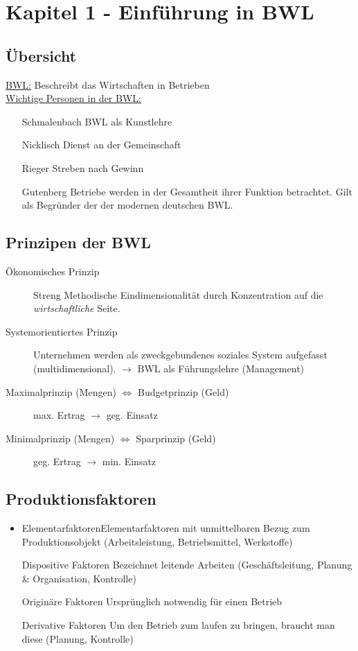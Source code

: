 \section{Kapitel 1 - Einführung in BWL}
\subsection{Übersicht}
\underline{BWL:} Beschreibt das Wirtschaften in Betrieben\\
\underline{Wichtige Personen in der BWL:}
\begin{itemize}
  \item[Schmalenbach] \nl BWL als Kunstlehre
  \item[Nicklisch] \nl Dienst an der Gemeinschaft
  \item[Rieger] \nl Streben nach Gewinn
  \item[Gutenberg] \nl Betriebe werden in der Gesamtheit ihrer Funktion betrachtet.
                   Gilt als Begründer der der modernen deutschen BWL.
\end{itemize}
\subsection{Prinzipen der BWL}
\begin{description}
  \item[Ökonomisches Prinzip] \nl Streng Methodische Eindimensionalität durch Konzentration
                auf die \emph{wirtschaftliche} Seite.
  \item[Systemorientiertes Prinzip] \nl Unternehmen werden als zweckgebundenes soziales System aufgefasst (multidimensional).
                                    $\rightarrow$ BWL als Führungslehre (Management)
  \item[Maximalprinzip (Mengen) $\Leftrightarrow$ Budgetprinzip (Geld) ] \nl max. Ertrag $\rightarrow$ geg. Einsatz
  \item[Minimalprinzip (Mengen) $\Leftrightarrow$ Sparprinzip (Geld)] \nl geg. Ertrag $\rightarrow$ min. Einsatz
\end{description}
\subsection{Produktionsfaktoren}
\begin{itemize}
  \item Elementarfaktoren\nl Elementarfaktoren mit unmittelbaren Bezug zum Produktionsobjekt (Arbeitsleistung, Betriebsmittel, Werkstoffe)
  \item[\textbullet Dispositive Faktoren]\nl Bezeichnet leitende Arbeiten (Geschäftsleitung, Planung \& Organisation, Kontrolle)
  \item[\textbullet Originäre Faktoren]\nl Ursprünglich notwendig für einen Betrieb
  \item[\textbullet Derivative Faktoren]\nl Um den Betrieb zum laufen zu bringen, braucht man diese (Planung, Kontrolle)
\end{itemize} 

